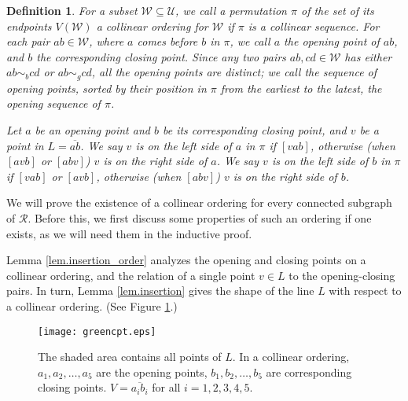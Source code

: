 \documentclass[12pt]{article}
\newcommand{\ov}{\overline}
\newtheorem{defi}{Definition}
\begin{document}
\begin{defi}
For a subset $\mathcal{W} \subseteq \mathcal{U}$,
we call a permutation $\pi$ of the set of its endpoints $V(\mathcal{W})$
a {\em collinear ordering} for $\mathcal{W}$ if $\pi$ is a collinear sequence.
For each pair $ab \in \mathcal{W}$,
where $a$ comes before $b$ in $\pi$,
we call $a$ the {\em opening point} of $ab$,
and $b$ the corresponding {\em closing point}.
Since any two pairs $ab, cd \in \mathcal{W}$
has either $ab \sim_b cd$ or $ab \sim_g cd$,
all the opening points are distinct;
we call the sequence of opening points,
sorted by their position in $\pi$ from the earliest to the latest,
the {\em opening sequence} of $\pi$.

Let $a$ be an opening point and $b$ be its corresponding closing point,
and $v$ be a point in $L = \ov{ab}$.
We say $v$ is on the {\em left side} of $a$ in $\pi$
if $[vab]$, otherwise (when $[avb]$ or $[abv]$) $v$ is on the {\em right side} of $a$.
We say $v$ is on the {\em left side} of $b$ in $\pi$
if $[vab]$ or $[avb]$, otherwise (when $[abv]$) $v$ is on the {\em right side} of $b$.
\end{defi}

We will prove the existence of a collinear ordering for every connected
subgraph of $\mathcal{R}$.
Before this, we first discuss some properties of such an ordering if
one exists, as we will need them in the inductive proof.

Lemma \ref{lem.insertion_order} analyzes the opening and closing points
on a collinear ordering, and the relation of a single point $v \in L$
to the opening-closing pairs.
In turn, Lemma \ref{lem.insertion} gives the shape of the line $L$
with respect to a collinear ordering.
(See Figure \ref{fig.green_cpt}.)

\begin{figure}[h!]
\begin{center}
\texttt{[image: greencpt.eps]}
\caption{The shaded area contains all points of $L$. 
In a collinear ordering, $a_1, a_2, \dots, a_5$ are the opening points,
$b_1, b_2, \dots, b_5$ are corresponding closing points.
$V = \ov{a_ib_i}$ for all $i=1, 2, 3, 4, 5$.}
\label{fig.green_cpt}
\end{center}
\end{figure}
\end{document}
